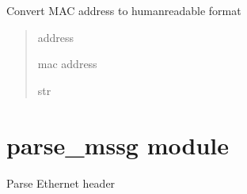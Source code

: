 \documentclass[letterpaper,10pt,english]{sphinxmanual}
\begin{document}
\begin{fulllineitems}
\label{\detokenize{modules/addres_conv:addres_conv.mac_addr}}
\pysigstartsignatures
\pysiglinewithargsret
{}
{}
{}
\pysigstopsignatures
\sphinxAtStartPar
Convert MAC address to human\sphinxhyphen{}readable format
\begin{quote}\begin{description}
\sphinxAtStartPar
{} \textendash{} address

\sphinxAtStartPar
mac address

\sphinxAtStartPar
str

\end{description}\end{quote}

\end{fulllineitems}


\sphinxstepscope


\chapter{parse\_mssg module}
\label{\detokenize{modules/parse_mssg:module-parse_mssg}}\label{\detokenize{modules/parse_mssg:parse-mssg-module}}\label{\detokenize{modules/parse_mssg::doc}}

\begin{fulllineitems}
\label{\detokenize{modules/parse_mssg:parse_mssg.parse_ethernet}}
\pysigstartsignatures
\pysiglinewithargsret
{}
{}
{}
\pysigstopsignatures
\sphinxAtStartPar
Parse Ethernet header

\end{fulllineitems}

\end{document}
